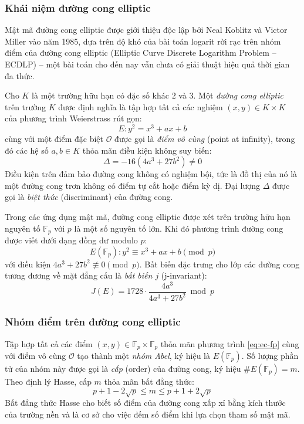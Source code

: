 \subsubsection{Khái niệm đường cong elliptic}

Mật mã đường cong elliptic được giới thiệu độc lập bởi Neal Koblitz và Victor Miller vào năm 1985, dựa trên độ khó của bài toán logarit rời rạc trên nhóm điểm của đường cong elliptic (Elliptic Curve Discrete Logarithm Problem -- ECDLP) -- một bài toán cho đến nay vẫn chưa có giải thuật hiệu quả thời gian đa thức.

Cho $K$ là một trường hữu hạn có đặc số khác $2$ và $3$. Một \textit{đường cong elliptic} trên trường $K$ được định nghĩa là tập hợp tất cả các nghiệm $(x, y) \in K \times K$ của phương trình Weierstrass rút gọn:
\begin{equation}
E: y^2 = x^3 + ax + b
\label{eq:ec-weierstrass}
\end{equation}
cùng với một điểm đặc biệt $\mathcal{O}$ được gọi là \textit{điểm vô cùng} (point at infinity), trong đó các hệ số $a, b \in K$ thỏa mãn điều kiện không suy biến:
\begin{equation}
\Delta = -16(4a^3 + 27b^2) \neq 0
\label{eq:ec-discriminant}
\end{equation}
Điều kiện trên đảm bảo đường cong không có nghiệm bội, tức là đồ thị của nó là một đường cong trơn không có điểm tự cắt hoặc điểm kỳ dị. Đại lượng $\Delta$ được gọi là \textit{biệt thức} (discriminant) của đường cong.

Trong các ứng dụng mật mã, đường cong elliptic được xét trên trường hữu hạn nguyên tố $\mathbb{F}_p$ với $p$ là một số nguyên tố lớn. Khi đó phương trình đường cong được viết dưới dạng đồng dư modulo $p$:
\begin{equation}
E(\mathbb{F}_p): y^2 \equiv x^3 + ax + b \pmod{p}
\label{eq:ec-fp}
\end{equation}
với điều kiện $4a^3 + 27b^2 \not\equiv 0 \pmod{p}$. Bất biến đặc trưng cho lớp các đường cong tương đương về mặt đẳng cấu là \textit{bất biến $j$} (j-invariant):
\begin{equation}
J(E) = 1728 \cdot \frac{4a^3}{4a^3 + 27b^2} \bmod p
\label{eq:ec-jinvariant}
\end{equation}

\subsubsection{Nhóm điểm trên đường cong elliptic}

Tập hợp tất cả các điểm $(x, y) \in \mathbb{F}_p \times \mathbb{F}_p$ thỏa mãn phương trình \eqref{eq:ec-fp} cùng với điểm vô cùng $\mathcal{O}$ tạo thành một \textit{nhóm Abel}, ký hiệu là $E(\mathbb{F}_p)$. Số lượng phần tử của nhóm này được gọi là \textit{cấp} (order) của đường cong, ký hiệu $\#E(\mathbb{F}_p) = m$. Theo định lý Hasse, cấp $m$ thỏa mãn bất đẳng thức:
\begin{equation}
p + 1 - 2\sqrt{p} \leq m \leq p + 1 + 2\sqrt{p}
\label{eq:hasse}
\end{equation}
Bất đẳng thức Hasse cho biết số điểm của đường cong xấp xỉ bằng kích thước của trường nền và là cơ sở cho việc đếm số điểm khi lựa chọn tham số mật mã.

